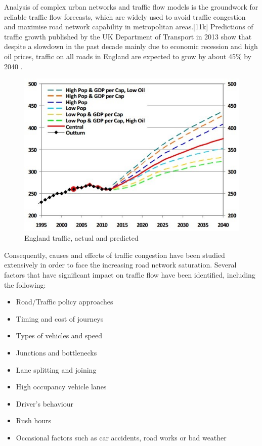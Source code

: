 \documentclass[11pt]{article}
\begin{document}
Analysis of complex urban networks and traffic flow models is the groundwork for reliable traffic flow forecasts, which are widely used to avoid traffic congestion and maximise road network capability in metropolitan areas.[11k] Predictions of traffic growth published by the UK Department of Transport in 2013 show that despite a slowdown in the past decade mainly due to economic recession and high oil prices, traffic on all roads in England are expected to grow by about 45\% by 2040 \cite{10j}. 


\begin{figure}[h]
\begin{center}
\includegraphics[scale=0.7]{england_traffic}
\caption{England traffic, actual and predicted}
\end{center}
\end{figure}


Consequently, causes and effects of traffic congestion have been studied extensively in order to face the increasing road network saturation. Several factors that have significant impact on traffic flow have been identified, including the following: 
\begin{singlespace}
\begin{itemize}\itemsep0pt
\item Road/Traffic policy approaches
\item Timing and cost of journeys
\item Types of vehicles and speed
\item Junctions and bottlenecks
\item Lane splitting and joining
\item High occupancy vehicle lanes
\item Driver\textquoteright s behaviour
\item Rush hours
\item Occasional factors such as car accidents, road works or bad weather
\end{itemize}
\end{singlespace}
\end{document}
